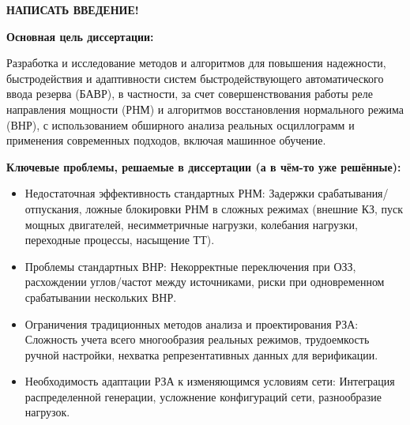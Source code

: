 \noindent\textbf{НАПИСАТЬ ВВЕДЕНИЕ!}\par\vspace{0.3cm}
\par\vspace{0.3cm}
\noindent\textbf{Основная цель диссертации:}\par\vspace{0.2cm}
Разработка и исследование методов и алгоритмов для повышения надежности, быстродействия и адаптивности систем быстродействующего автоматического ввода резерва (БАВР), в частности, за счет совершенствования работы реле направления мощности (РНМ) и алгоритмов восстановления нормального режима (ВНР), с использованием обширного анализа реальных осциллограмм и применения современных подходов, включая машинное обучение.\par\vspace{0.2cm}
\par\vspace{0.3cm}
\noindent\textbf{Ключевые проблемы, решаемые в диссертации (а в чём-то уже решённые):}\par\vspace{0.2cm}
\begin{itemize}
  \item Недостаточная эффективность стандартных РНМ: Задержки срабатывания/отпускания, ложные блокировки РНМ в сложных режимах (внешние КЗ, пуск мощных двигателей, несимметричные нагрузки, колебания нагрузки, переходные процессы, насыщение ТТ).
  \item Проблемы стандартных ВНР: Некорректные переключения при ОЗЗ, расхождении углов/частот между источниками, риски при одновременном срабатывании нескольких ВНР.
  \item Ограничения традиционных методов анализа и проектирования РЗА: Сложность учета всего многообразия реальных режимов, трудоемкость ручной настройки, нехватка репрезентативных данных для верификации.
  \item Необходимость адаптации РЗА к изменяющимся условиям сети: Интеграция распределенной генерации, усложнение конфигураций сети, разнообразие нагрузок.
\end{itemize}
